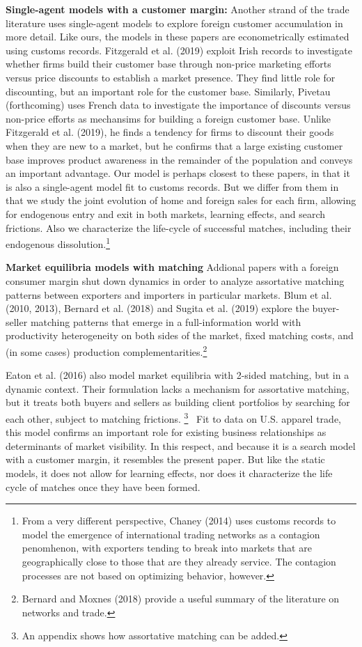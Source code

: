 \documentclass[12pt]{article}
\begin{document}
\textbf{Single-agent models with a customer margin:} Another strand of the
trade literature uses single-agent models to explore foreign customer
accumulation in more detail. Like ours, the models in these papers are
econometrically estimated using customs records. Fitzgerald et al. (2019)
exploit Irish records to investigate whether firms build their customer base
through non-price marketing efforts versus price discounts to establish a
market presence. They find little role for discounting, but an important
role for the customer base. Similarly, Pivetau (forthcoming) uses French
data to investigate the importance of discounts versus non-price efforts as
mechansims for building a foreign customer base. Unlike Fitzgerald et al.
(2019), he finds a tendency for firms to discount their goods when they are
new to a market, but he confirms that a large existing customer base
improves product awareness in the remainder of the population and conveys an
important advantage. Our model is perhaps closest to these papers, in that
it is also a single-agent model fit to customs records. But we differ from
them in that we study the joint evolution of home and foreign sales for each
firm, allowing for endogenous entry and exit in both markets, learning
effects, and search frictions. Also we characterize the life-cycle of
successful matches, including their endogenous dissolution.\footnote{%
From a very different perspective, Chaney (2014) uses customs records to
model the emergence of international trading networks as a contagion
penomhenon, with exporters tending to break into markets that are
geographically close to those that are they already service. The contagion
processes are not based on optimizing behavior, however.}

\textbf{Market equilibria models with matching }Addional papers with a
foreign consumer margin shut down dynamics in order to analyze assortative
matching patterns between exporters and importers in particular markets.
Blum et al. (2010, 2013), Bernard et al. (2018) and Sugita et al. (2019)
explore the buyer-seller matching patterns that emerge in a full-information
world with productivity heterogeneity on both sides of the market, fixed
matching costs, and (in some cases) production complementarities.\footnote{%
Bernard and Moxnes (2018) provide a useful summary of the literature on
networks and trade.\medskip}

Eaton et al. (2016) also model market equilibria with 2-sided matching, but
in a dynamic context. Their formulation lacks a mechanism for assortative
matching, but it treats both buyers and sellers as building client
portfolios by searching for each other, subject to matching frictions.%
\footnote{%
An appendix shows how assortative matching can be added.\medskip} \ Fit to data on
U.S. apparel trade, this model confirms an important role for existing
business relationships as determinants of market visibility. In this
respect, and because it is a search model with a customer margin, it
resembles the present paper. But like the static models, it does not allow
for learning effects, nor does it characterize the life cycle of matches
once they have been formed.
\end{document}
